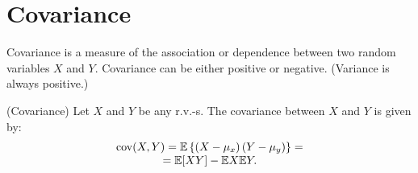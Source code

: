 \section{Covariance}
\par 
Covariance is a measure of the association or dependence between two random
variables $X$ and $Y$. Covariance can be either positive or negative. (Variance is
always positive.)

\begin{definition}{(Covariance)}{}
    Let $X$ and $Y$ be any r.v.-s. The covariance between $X$ and $Y$ is given by:
    \[
        \begin{array}{c}
        \operatorname{cov} (X, Y) = \mathbb{E} \left\{\left(X - \mu_x\right)\left(Y - \mu_y\right) \right\} = \\ = \mathbb{E}[XY] - \mathbb{E} X \mathbb{E} Y.  
        \end{array}
    \]
\end{definition}
